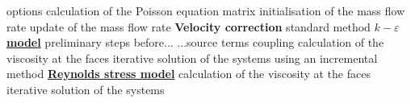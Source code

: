 \begin{table}[htp]
options\newline
\hspace*{2,5cm} \hspace*{1cm}calculation of the Poisson
equation matrix\newline
\hspace*{2,5cm} \hspace*{1cm}initialisation of the mass flow
rate\newline
\hspace*{2,5cm} \hspace*{1cm}update of the mass flow rate%
\newline
\hspace*{1,5cm} \textbf{Velocity correction}\newline
\hspace*{3,2cm} \hspace*{1cm}standard method\newline
\underline{\textbf{$k-\varepsilon$ model}}\newline
\hspace*{1cm}\newline
\hspace*{1,5cm} \hspace*{1cm}preliminary steps before...\newline
\hspace*{1,5cm} \hspace*{1,5cm}...source terms coupling\newline
\hspace*{1,5cm} \hspace*{1cm}calculation of the viscosity at
the faces\newline
\hspace*{1,5cm} \hspace*{1cm}iterative solution of the systems
using an incremental method\newline
\underline{\textbf{Reynolds stress model}}\newline
\hspace*{1cm}\newline
\hspace*{1,5cm} \hspace*{1cm}calculation of the viscosity at
the faces\newline
\hspace*{1,5cm} \hspace*{1cm}iterative solution of the systems

\end{table}
